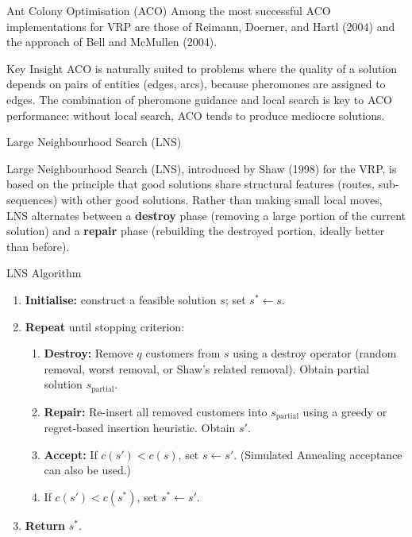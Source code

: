 \documentclass[aspectratio=169,10pt]{beamer}
\begin{document}
\begin{frame}[allowframebreaks]{Ant Colony Optimisation (ACO)}
  Among the most successful ACO implementations for VRP are those of
  Reimann, Doerner, and Hartl (2004) and the approach of Bell and
  McMullen (2004).

  \begin{alertblock}{Key Insight}
    ACO is naturally suited to problems where the quality of a solution
    depends on pairs of entities (edges, arcs), because pheromones are
    assigned to edges.  The combination of pheromone guidance and
    local search is key to ACO performance: without local search, ACO
    tends to produce mediocre solutions.
  \end{alertblock}

\end{frame}

\begin{frame}[allowframebreaks]{Large Neighbourhood Search (LNS)}

  Large Neighbourhood Search (LNS), introduced by Shaw (1998) for the
  VRP, is based on the principle that good solutions share structural
  features (routes, sub-sequences) with other good solutions.  Rather
  than making small local moves, LNS alternates between a
  \textbf{destroy} phase (removing a large portion of the current
  solution) and a \textbf{repair} phase (rebuilding the destroyed
  portion, ideally better than before).

  \begin{block}{LNS Algorithm}
    \begin{enumerate}
      \item \textbf{Initialise:} construct a feasible solution $s$;
            set $s^* \leftarrow s$.
      \item \textbf{Repeat} until stopping criterion:
        \begin{enumerate}
          \item[(a)] \textbf{Destroy:} Remove $q$ customers from $s$
                using a destroy operator (random removal, worst removal,
                or Shaw's related removal).  Obtain partial solution
                $s_{\text{partial}}$.
          \item[(b)] \textbf{Repair:} Re-insert all removed customers
                into $s_{\text{partial}}$ using a greedy or
                regret-based insertion heuristic.  Obtain $s'$.
          \item[(c)] \textbf{Accept:} If $c(s') < c(s)$, set
                $s \leftarrow s'$.  (Simulated Annealing acceptance
                can also be used.)
          \item[(d)] If $c(s') < c(s^*)$, set $s^* \leftarrow s'$.
        \end{enumerate}
      \item \textbf{Return} $s^*$.
    \end{enumerate}
  \end{block}


\end{frame}
\end{document}

